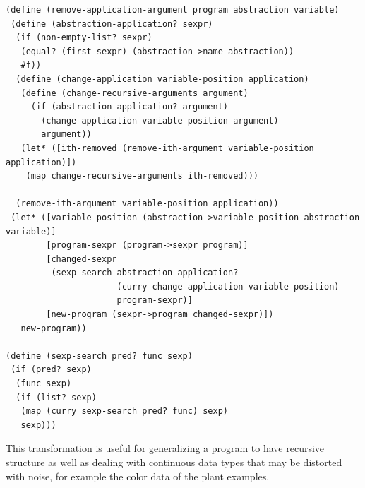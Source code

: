 \documentclass[a4paper,10pt]{article}
\begin{document}
\begin{verbatim}
(define (remove-application-argument program abstraction variable)
 (define (abstraction-application? sexpr)
  (if (non-empty-list? sexpr)
   (equal? (first sexpr) (abstraction->name abstraction))
   #f))
  (define (change-application variable-position application)
   (define (change-recursive-arguments argument) 
     (if (abstraction-application? argument)
       (change-application variable-position argument)
       argument))
   (let* ([ith-removed (remove-ith-argument variable-position application)])
    (map change-recursive-arguments ith-removed)))
 
  (remove-ith-argument variable-position application))
 (let* ([variable-position (abstraction->variable-position abstraction variable)]
        [program-sexpr (program->sexpr program)]
        [changed-sexpr 
         (sexp-search abstraction-application? 
                      (curry change-application variable-position) 
                      program-sexpr)]
        [new-program (sexpr->program changed-sexpr)])
   new-program))
  
(define (sexp-search pred? func sexp)
 (if (pred? sexp)
  (func sexp)
  (if (list? sexp)
   (map (curry sexp-search pred? func) sexp)
   sexp)))
\end{verbatim}
This transformation is useful for generalizing a program to have recursive structure as well as dealing with continuous data types that may be distorted with noise, for example the color data of the plant examples.
\end{document}
